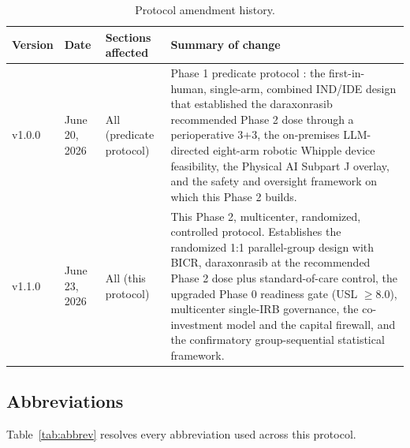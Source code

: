 \begin{table}[htbp]
\centering
\footnotesize
\caption{Protocol amendment history.}
\label{tab:amend}
\begin{tabularx}{\textwidth}{L{2.0cm} L{2.6cm} L{3.2cm} Y}
\toprule
\textbf{Version} & \textbf{Date} & \textbf{Sections affected} & \textbf{Summary of change} \\
\midrule
v1.0.0 & June 20, 2026 & All (predicate protocol) & Phase 1 predicate protocol \cite{kawchak2026phase1}: the first-in-human, single-arm, combined IND/IDE design that established the daraxonrasib recommended Phase 2 dose through a perioperative 3+3, the on-premises LLM-directed eight-arm robotic Whipple device feasibility, the Physical AI Subpart J overlay, and the safety and oversight framework on which this Phase 2 builds. \\
v1.1.0 & June 23, 2026 & All (this protocol) & This Phase 2, multicenter, randomized, controlled protocol. Establishes the randomized 1:1 parallel-group design with BICR, daraxonrasib at the recommended Phase 2 dose plus standard-of-care control, the upgraded Phase 0 readiness gate (USL $\geq 8.0$), multicenter single-IRB governance, the co-investment model and the capital firewall, and the confirmatory group-sequential statistical framework. \\
\bottomrule
\end{tabularx}
\end{table}

\vspace{-0.2cm}

\subsection{Abbreviations}

Table~\ref{tab:abbrev} resolves every abbreviation used across this protocol.

